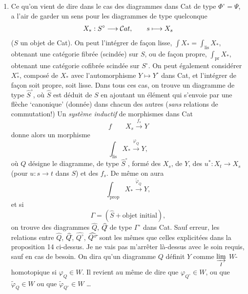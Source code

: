 \begin{enumerate}
\item[1)] Ce qu'on vient de dire dans le cas des diagrammes dans Cat de type $\Phi^\circ = \Psi$, a l'air de garder un sens pour les diagrammes de type quelconque
\[
X_* : S^\circ \longrightarrow \mathcal{C}at, \qquad s \longmapsto X_s
\]
($S$ un objet de Cat). On peut l'intégrer de façon lisse, $\int X_* = \int_{\mathrm{lis}} X_*$, obtenant une catégorie fibrée (scindée) sur $S$, ou de façon propre, $\int_{\mathrm{pr}} X_*$, obtenant une catégorie cofibrée scindée sur $S^\circ$. On peut également considérer $X_*^\circ$, composé de $X_*$ avec l'automorphisme $Y \longmapsto Y^\circ$ dans Cat, et l'intégrer de façon soit propre, soit lisse. Dans tous ces cas, on trouve un diagramme de type $\widehat{S}^\circ$, où $\widehat{S}$ est déduit de $S$ en ajoutant un élément qui s'envoie par une flèche ‘canonique’ (donnée) dans chacun des autres (\textit{sans} relations de commutation!) Un
\textit{système inductif} de morphismes dans Cat
\[
f \qquad X_s \xrightarrow{f_s} Y
\]
donne alors un morphisme
\[
\int_{\mathrm{lis}} X_* \xrightarrow{\varphi_Q} Y,
\]
où $Q$ désigne le diagramme, de type $\widehat{S}^\circ$, formé des $X_s$, de $Y$, des $u^* : X_t \longrightarrow X_s$ (pour $u : s \longrightarrow t$ dans $S$) et des $f_s$. De même on aura
\[
\int_{\mathrm{prop}} X_* \xrightarrow{\tilde{\varphi}_Q} Y,
\]
et si
\[
\Gamma = (\widehat{S} + \text{objet initial}),
\]
on trouve des diagrammes $\widehat{Q}$, $\widehat{Q}\tilde{}$ de type $\Gamma^\circ$ dans Cat. Sauf erreur, les relations entre $\widehat{Q}$, $\widehat{Q}\tilde{}$, $\widehat{Q^\circ}$, $\widehat{Q^\circ}\tilde{}$ sont les mêmes que celles explicitées dans la proposition 14 ci-dessus. Je ne vais pas m'arrêter là-dessus avec le soin requis, sauf en cas de besoin. On dira qu'un diagramme $Q$ définit $Y$ comme $\varinjlim\limits_{I}$ $W$-homotopique si $\varphi_Q \in W$. Il revient au même de dire que $\varphi_{Q^\circ} \in W$, ou que $\tilde{\varphi}_Q \in W$ ou que $\tilde{\varphi}_{Q^\circ} \in W$ \dots
{}


\end{enumerate}
